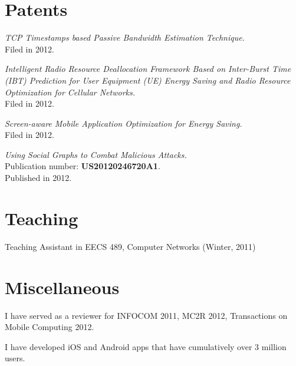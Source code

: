 \documentclass[letterpaper]{article}
\renewenvironment{itemize}{
  \begin{list}{}{
    \setlength{\leftmargin}{1em}
  }
}{
  \end{list}
}
\begin{document}
\section*{Patents}
\begin{itemize}
\item {{\em TCP Timestamps based Passive Bandwidth Estimation Technique.} \\Filed in 2012.}
\item {{\em Intelligent Radio Resource Deallocation Framework Based on Inter-Burst Time (IBT) Prediction for User Equipment (UE) Energy Saving and Radio Resource Optimization for Cellular Networks.} \\Filed in 2012.}
\item {{\em Screen-aware Mobile Application Optimization for Energy Saving.} \\Filed in 2012.}
\item {{\em Using Social Graphs to Combat Malicious Attacks.}\\Publication number: {\bf US20120246720A1}. \\Published in 2012.}
\end{itemize}


\section*{Teaching}
\begin{itemize}
\item {Teaching Assistant in EECS 489, Computer Networks (Winter, 2011)}
\end{itemize}

\section*{Miscellaneous}
\begin{itemize}
\item {I have served as a reviewer for INFOCOM 2011, MC2R 2012, Transactions on Mobile Computing 2012.}
\item {I have developed iOS and Android apps that have cumulatively over 3 million users.}
\end{itemize}
\end{document}
